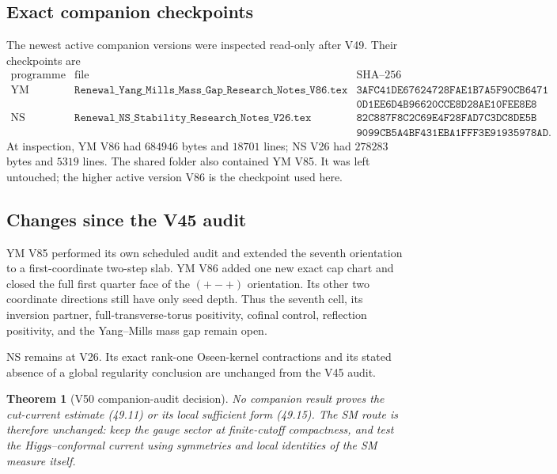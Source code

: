 \documentclass[11pt]{article}
\newtheorem{theorem}{Theorem}[section]
\theoremstyle{remark}
\begin{document}
\subsection{Exact companion checkpoints}

The newest active companion versions were inspected read-only after
V49.  Their checkpoints are
\[
\begin{array}{lll}
\text{programme}&\text{file}&\text{SHA--256}\\
\text{YM}&
\texttt{Renewal\_Yang\_Mills\_Mass\_Gap\_Research\_Notes\_V86.tex}&
\texttt{3AFC41DE67624728FAE1B7A5F90CB6471}\\
&&\texttt{0D1EE6D4B96620CCE8D28AE10FEE8E8}\\
\text{NS}&
\texttt{Renewal\_NS\_Stability\_Research\_Notes\_V26.tex}&
\texttt{82C887F8C2C69E4F28FAD7C3DC8DE5B}\\
&&\texttt{9099CB5A4BF431EBA1FFF3E91935978AD}.
\end{array}                                        \tag{50.1}
\]
At inspection, YM V86 had \(684946\) bytes and \(18701\) lines; NS
V26 had \(278283\) bytes and \(5319\) lines.  The shared folder also
contained YM V85.  It was left untouched; the higher active version
V86 is the checkpoint used here.

\subsection{Changes since the V45 audit}

YM V85 performed its own scheduled audit and extended the seventh
orientation to a first-coordinate two-step slab.  YM V86 added one
new exact cap chart and closed the full first quarter face of the
\((+-+)\) orientation.  Its other two coordinate directions still
have only seed depth.  Thus the seventh cell, its inversion partner,
full-transverse-torus positivity, cofinal control, reflection
positivity, and the Yang--Mills mass gap remain open.

NS remains at V26.  Its exact rank-one Oseen-kernel contractions and
its stated absence of a global regularity conclusion are unchanged
from the V45 audit.

\begin{theorem}[V50 companion-audit decision]
\label{thm:v17v50-decision}
No companion result proves the cut-current estimate (49.11) or its
local sufficient form (49.15).  The SM route is therefore unchanged:
keep the gauge sector at finite-cutoff compactness, and test the
Higgs--conformal current using symmetries and local identities of the
SM measure itself.
\end{theorem}
\end{document}
